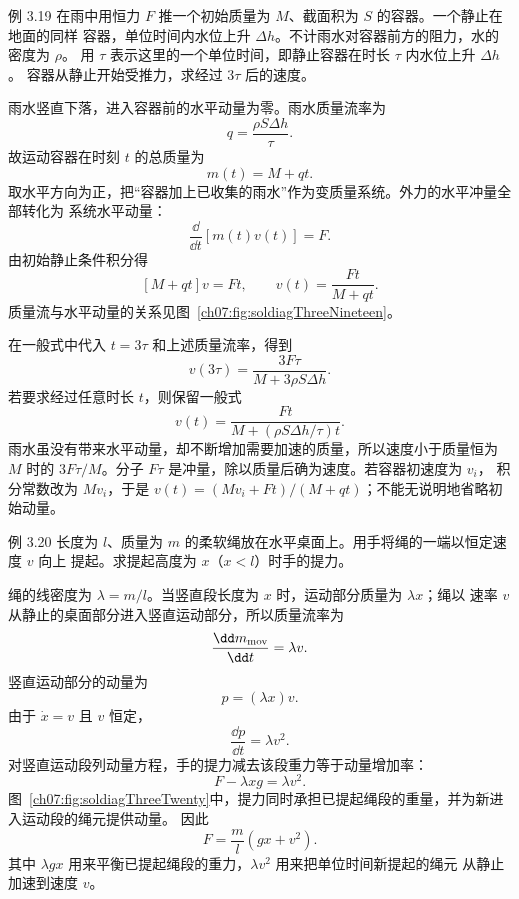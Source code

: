 \begin{origexamplebox}{例 3.19}
在雨中用恒力 $F$ 推一个初始质量为 $M$、截面积为 $S$ 的容器。一个静止在地面的同样
容器，单位时间内水位上升 $\Delta h$。不计雨水对容器前方的阻力，水的密度为 $\rho$。
用 $\tau$ 表示这里的一个单位时间，即静止容器在时长 $\tau$ 内水位上升 $\Delta h$。
容器从静止开始受推力，求经过 $3\tau$ 后的速度。
\end{origexamplebox}

\begin{xesolution}
雨水竖直下落，进入容器前的水平动量为零。雨水质量流率为
\[
 q=\frac{\rho S\Delta h}{\tau}.
\]
故运动容器在时刻 $t$ 的总质量为
\[
 m(t)=M+qt.
\]
取水平方向为正，把“容器加上已收集的雨水”作为变质量系统。外力的水平冲量全部转化为
系统水平动量：
\[
 \frac{\dd}{\dd t}[m(t)v(t)]=F.
\]
由初始静止条件积分得
\[
 [M+qt]v=Ft,
 \qquad
 v(t)=\frac{Ft}{M+qt}.
\]
质量流与水平动量的关系见图~\ref{ch07:fig:soldiagThreeNineteen}。

\soldiagThreeNineteen
在一般式中代入 $t=3\tau$ 和上述质量流率，得到
\[
 \boxed{v(3\tau)=\frac{3F\tau}{M+3\rho S\Delta h}}.
\]
若要求经过任意时长 $t$，则保留一般式
\[
 \boxed{v(t)=\frac{Ft}{M+(\rho S\Delta h/\tau)t}}.
\]
雨水虽没有带来水平动量，却不断增加需要加速的质量，所以速度小于质量恒为 $M$ 时的
$3F\tau/M$。分子 $F\tau$ 是冲量，除以质量后确为速度。若容器初速度为 $v_i$，
积分常数改为 $Mv_i$，于是 $v(t)=(Mv_i+Ft)/(M+qt)$；不能无说明地省略初始动量。
\end{xesolution}

\begin{origexamplebox}{例 3.20}
长度为 $l$、质量为 $m$ 的柔软绳放在水平桌面上。用手将绳的一端以恒定速度 $v$ 向上
提起。求提起高度为 $x$（$x<l$）时手的提力。
\end{origexamplebox}

\begin{xesolution}
绳的线密度为 $\lambda=m/l$。当竖直段长度为 $x$ 时，运动部分质量为 $\lambda x$；绳以
速率 $v$ 从静止的桌面部分进入竖直运动部分，所以质量流率为
\[
 \frac{\dd m_{\rm mov}}{\dd t}=\lambda v.
\]
竖直运动部分的动量为
\[
 p=(\lambda x)v.
\]
由于 $\dot x=v$ 且 $v$ 恒定，
\[
 \frac{\dd p}{\dd t}=\lambda v^2.
\]
对竖直运动段列动量方程，手的提力减去该段重力等于动量增加率：
\[
 F-\lambda xg=\lambda v^2.
\]
图~\ref{ch07:fig:soldiagThreeTwenty}中，提力同时承担已提起绳段的重量，并为新进入运动段的绳元提供动量。
\soldiagThreeTwenty
因此
\[
 \boxed{F=\frac{m}{l}(gx+v^2)}.
\]
其中 $\lambda gx$ 用来平衡已提起绳段的重力，$\lambda v^2$ 用来把单位时间新提起的绳元
从静止加速到速度 $v$。
\end{xesolution}

